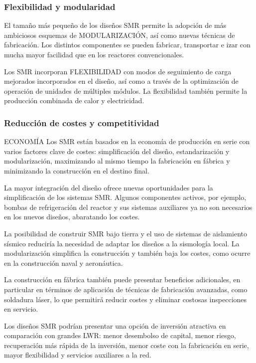 \subsubsection{Flexibilidad y modularidad}

El tamaño más pequeño de los diseños SMR permite la adopción de más ambiciosos esquemas de MODULARIZACIÓN, así como nuevas técnicas de fabricación. Los distintos componentes se pueden fabricar, transportar e izar con mucha mayor facilidad que en los reactores convencionales.

Los SMR incorporan FLEXIBILIDAD con modos de seguimiento de carga mejorados incorporados en el diseño, así como a través de la optimización de operación de unidades de múltiples módulos. La flexibilidad también permite la producción combinada de calor y electricidad.

\subsubsection{Reducción de costes y competitividad}
ECONOMÍA
Los SMR están basados en la economía de producción en serie con varios factores clave de costes: simplificación del diseño, estandarización y modularización, maximizando al mismo tiempo la fabricación en fábrica y minimizando la construcción en el destino final.

La mayor integración del diseño ofrece nuevas oportunidades para la simplificación de los sistemas SMR. Algunos componentes activos, por ejemplo, bombas de refrigeración del reactor y sus sistemas auxiliares ya no son necesarios en los nuevos diseños, abaratando los costes.

La posibilidad de construir SMR bajo tierra y el uso de sistemas de aislamiento sísmico reduciría la necesidad de adaptar los diseños a la sismología local. La modularización simplifica la construcción y también baja los costes, como ocurre en la construcción naval y aeronáutica.

La construcción en fábrica también puede presentar beneficios adicionales, en particular en términos de aplicación de técnicas de fabricación avanzadas, como soldadura láser, lo que permitirá reducir costes y eliminar costosas inspecciones en servicio.

Los diseños SMR podrían presentar una opción de inversión atractiva en comparación con grandes LWR: menor desembolso de capital, menor riesgo, recuperación más rápida de la inversión, menor coste con la fabricación en serie, mayor flexibilidad y servicios auxiliares a la red.

